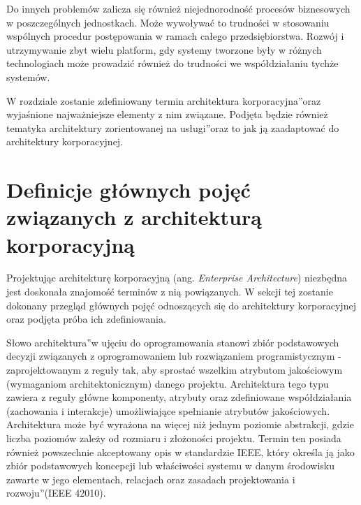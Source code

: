 Do innych problemów zalicza się również niejednorodność procesów biznesowych w poszczególnych jednostkach. Może wywoływać to trudności w stosowaniu wspólnych procedur postępowania w ramach całego przedsiębiorstwa. Rozwój i utrzymywanie zbyt wielu platform, gdy systemy tworzone były w różnych technologiach może prowadzić również do trudności we współdziałaniu tychże systemów.

W rozdziale zostanie zdefiniowany termin \quotedblbase architektura korporacyjna\textquotedblright oraz wyjaśnione najważniejsze elementy z nim związane. Podjęta będzie również tematyka \quotedblbase architektury zorientowanej na usługi\textquotedblright oraz to jak ją zaadaptować do architektury korporacyjnej. 

\section{Definicje głównych pojęć związanych z architekturą korporacyjną}
Projektując architekturę korporacyjną (ang. \textit{Enterprise Architecture}) niezbędna jest doskonała znajomość terminów z nią powiązanych. W sekcji tej zostanie dokonany przegląd głównych pojęć odnoszących się do architektury korporacyjnej oraz podjęta próba ich zdefiniowania.

Słowo \quotedblbase architektura\textquotedblright w ujęciu do oprogramowania stanowi zbiór podstawowych decyzji związanych z oprogramowaniem lub rozwiązaniem programistycznym - zaprojektowanym z reguły tak, aby sprostać wszelkim atrybutom jakościowym (wymaganiom architektonicznym) danego projektu. Architektura tego typu zawiera z reguły główne komponenty, atrybuty oraz zdefiniowane współdziałania (zachowania i interakcje) umożliwiające spełnianie atrybutów jakościowych. Architektura może być wyrażona na więcej niż jednym poziomie abstrakcji, gdzie liczba poziomów zależy od rozmiaru i złożoności projektu. Termin ten posiada również powszechnie akceptowany opis w standardzie IEEE, który określa ją jako \quotedblbase zbiór podstawowych koncepcji lub właściwości systemu w danym środowisku zawarte w jego elementach, relacjach oraz zasadach projektowania i rozwoju\textquotedblright (IEEE 42010). \cite{SOAWzorceArch}

